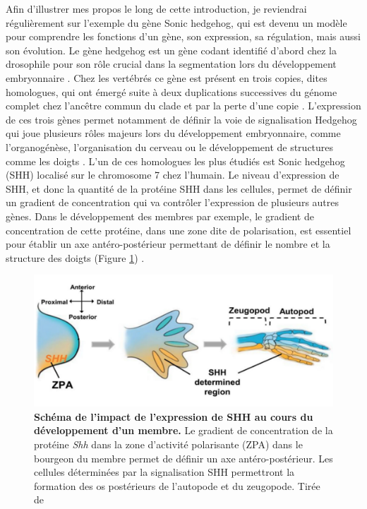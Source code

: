 Afin d’illustrer mes propos le long de cette introduction, je reviendrai régulièrement sur l’exemple du gène Sonic hedgehog, qui est devenu un modèle pour comprendre les fonctions d’un gène, son expression, sa régulation, mais aussi son évolution. Le gène hedgehog est un gène codant identifié d’abord chez la drosophile pour son rôle crucial dans la segmentation lors du développement embryonnaire \citep{nusslein-volhard_mutations_1980}. Chez les vertébrés ce gène est présent en trois copies, dites homologues, qui ont émergé suite à deux duplications successives du génome complet chez l’ancêtre commun du clade et par la perte d’une copie \citep{dehal_two_2005}. L’expression de ces trois gènes permet notamment de définir la voie de signalisation Hedgehog qui joue plusieurs rôles majeurs lors du développement embryonnaire, comme l’organogénèse, l’organisation du cerveau ou le développement de structures comme les doigts \citep{lum_hedgehog_2004}. L’un de ces homologues les plus étudiés est Sonic hedgehog (\acrshort{SHH}) localisé sur le chromosome 7 chez l’humain. Le niveau d’expression de \acrshort{SHH}, et donc la quantité de la protéine \acrshort{SHH} dans les cellules, permet de définir un gradient de concentration qui va contrôler l’expression de plusieurs autres gènes. Dans le développement des membres par exemple, le gradient de concentration de cette protéine, dans une zone dite de polarisation, est essentiel pour établir un axe antéro-postérieur permettant de définir le nombre et la structure des doigts (Figure \ref{fig:Fig1}) \citep{riddle_sonic_1993, echelard_sonic_1993}.

\begin{figure}[h]
    \centering
    \includegraphics[width=1\textwidth, page=1] {figures/introduction/fig1.png}
    \caption[Schéma de l'impact de l'expression de \acrshort{SHH} au cours du développement d'un membre.]{
    \textbf{Schéma de l'impact de l'expression de \acrshort{SHH} au cours du développement d'un membre.} Le gradient de concentration de la protéine \textit{Shh} dans la zone d'activité polarisante (ZPA) dans le bourgeon du membre permet de définir un axe antéro-postérieur.  Les cellules déterminées par la signalisation SHH
permettront la formation des os postérieurs de l'autopode et du zeugopode.  Tirée de \citep{lezot_shh_2020}
    }
    \label{fig:Fig1}
\end{figure} 


